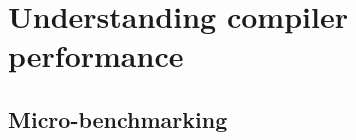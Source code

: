 



\chapter{Understanding compiler performance}
\label{chap:understanding-compiler-performance}


\section{Micro-benchmarking}
\label{sec:ubenchmark}

